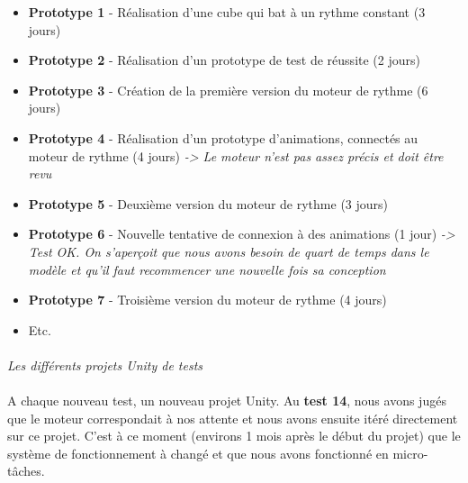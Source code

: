 \begin{itemize}
\item \textbf{Prototype 1} - Réalisation d’une cube qui bat à un rythme constant (3 jours)
\item \textbf{Prototype 2} - Réalisation d’un prototype de test de réussite (2 jours)
\item \textbf{Prototype 3} - Création de la première version du moteur de rythme (6 jours)
\item \textbf{Prototype 4} - Réalisation d’un prototype d’animations, connectés au moteur de rythme (4 jours) \emph{-> Le moteur n’est pas assez précis et doit être revu}
\item \textbf{Prototype 5} - Deuxième version du moteur de rythme (3 jours)
\item \textbf{Prototype 6} - Nouvelle tentative de connexion à des animations (1 jour) \emph{-> Test OK. On s’aperçoit que nous avons besoin de quart de temps dans le modèle et qu’il faut recommencer une nouvelle fois sa conception}
\item \textbf{Prototype 7} - Troisième version du moteur de rythme (4 jours)
\item Etc.
\end{itemize}

\paragraph{}
\noindent
{}
\begin{center}
\textit{Les différents projets Unity de tests
}
\end{center}

\paragraph{}
A chaque nouveau test, un nouveau projet Unity. Au \textbf{test 14}, nous avons jugés que le moteur correspondait à nos attente et nous avons ensuite itéré directement sur ce projet. C’est à ce moment (environs 1 mois après le début du projet) que le système de fonctionnement à changé et que nous avons fonctionné en micro-tâches.

